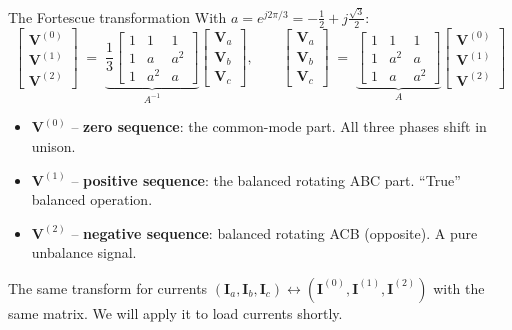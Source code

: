 \documentclass[aspectratio=169,10pt]{beamer}
\begin{document}
\begin{frame}{The Fortescue transformation}
With $a = e^{j 2\pi/3} = -\tfrac{1}{2} + j\tfrac{\sqrt{3}}{2}$:
\begin{equation*}
\begin{bmatrix} \mathbf{V}^{(0)} \\ \mathbf{V}^{(1)} \\ \mathbf{V}^{(2)} \end{bmatrix}
\;=\;
\underbrace{\frac{1}{3}\begin{bmatrix}
1 & 1   & 1   \\
1 & a   & a^2 \\
1 & a^2 & a
\end{bmatrix}}_{A^{-1}}
\begin{bmatrix} \mathbf{V}_a \\ \mathbf{V}_b \\ \mathbf{V}_c \end{bmatrix},
\qquad
\begin{bmatrix} \mathbf{V}_a \\ \mathbf{V}_b \\ \mathbf{V}_c \end{bmatrix}
\;=\;
\underbrace{\begin{bmatrix}
1 & 1   & 1   \\
1 & a^2 & a   \\
1 & a   & a^2
\end{bmatrix}}_{A}
\begin{bmatrix} \mathbf{V}^{(0)} \\ \mathbf{V}^{(1)} \\ \mathbf{V}^{(2)} \end{bmatrix}
\end{equation*}
\vspace{0.3em}
\begin{itemize}
  \item $\mathbf{V}^{(0)}$ -- \textbf{zero sequence}: the common-mode part. All three phases shift in unison.
  \item $\mathbf{V}^{(1)}$ -- \textbf{positive sequence}: the balanced rotating ABC part. ``True'' balanced operation.
  \item $\mathbf{V}^{(2)}$ -- \textbf{negative sequence}: balanced rotating ACB (opposite). A pure unbalance signal.
\end{itemize}
\vspace{0.3em}
\begin{alertblock}{The same transform for currents}
$(\mathbf{I}_a, \mathbf{I}_b, \mathbf{I}_c) \leftrightarrow (\mathbf{I}^{(0)}, \mathbf{I}^{(1)}, \mathbf{I}^{(2)})$ with the same matrix. We will apply it to load currents shortly.
\end{alertblock}
\end{frame}
\end{document}
